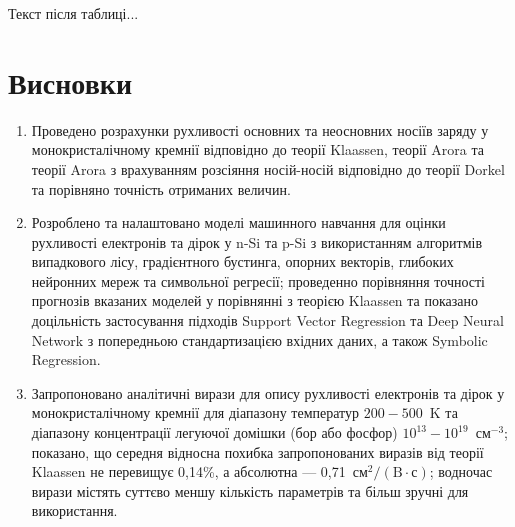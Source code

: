 \documentclass[12pt,a4paper,titlepage,oneside]{book}
\numberwithin{equation}{part}
\renewcommand{\theequation}{\thechapter.\arabic{equation}}
\begin{document}
Текст після таблиці...




\chapter*{Висновки}

\begin{enumerate}
  \item Проведено розрахунки рухливості основних та неосновних носіїв заряду у монокристалічному кремнії відповідно до теорії Klaassen,
  теорії Arora та теорії Arora з врахуванням розсіяння носій-носій відповідно до теорії Dorkel та порівняно точність отриманих величин.
  \item Розроблено та налаштовано моделі машинного навчання для оцінки рухливості електронів та дірок у n-Si та p-Si з використанням алгоритмів випадкового лісу, 
  градієнтного бустинга, опорних векторів, глибоких нейронних мереж та символьної регресії;
  проведенно порівняння точності прогнозів вказаних моделей у порівнянні з теорією Klaassen та показано доцільність застосування підходів Support Vector Regression
  та Deep Neural Network з попередньою стандартизацією вхідних даних, а також Symbolic Regression.
  \item Запропоновано аналітичні вирази для опису рухливості електронів та дірок у монокристалічному кремнії для діапазону температур $200-500$~K
  та діапазону концентрації легуючої домішки (бор або фосфор) $10^{13}-10^{19}$~см$^{-3}$;
  показано, що середня відносна похибка запропонованих виразів від теорії Klaassen не перевищує 0,14\%,
  а абсолютна --- 0,71~$\text{см}^2/(\text{B}\cdot\text{с})$;
  водночас вирази містять суттєво меншу кількість параметрів та більш зручні для використання.
\end{enumerate}




%



\vspace{-5cm}
\setcounter{page}{3}







\end{document}

